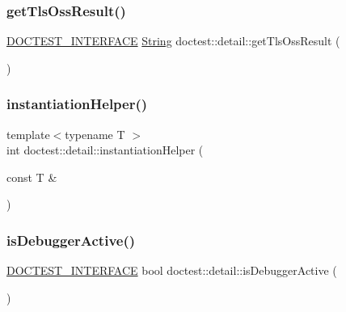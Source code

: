 \mbox{\label{namespacedoctest_1_1detail_a7b0b3df5fe79d7ffa8fa138201476df1}} 
\subsubsection{\texorpdfstring{get\+Tls\+Oss\+Result()}{getTlsOssResult()}}
{\footnotesize\ttfamily \mbox{\hyperlink{doctest_8h_a9c16ffc635ec47f07797d21ede26b1a5}{D\+O\+C\+T\+E\+S\+T\+\_\+\+I\+N\+T\+E\+R\+F\+A\+CE}} \mbox{\hyperlink{classdoctest_1_1_string}{String}} doctest\+::detail\+::get\+Tls\+Oss\+Result (\begin{DoxyParamCaption}{ }\end{DoxyParamCaption})}

\mbox{\label{namespacedoctest_1_1detail_aad401b097a9af4df1d4a9d0911957c0f}} 
\subsubsection{\texorpdfstring{instantiation\+Helper()}{instantiationHelper()}}
{\footnotesize\ttfamily template$<$typename T $>$ \\
int doctest\+::detail\+::instantiation\+Helper (\begin{DoxyParamCaption}\item[{const T \&}]{ }\end{DoxyParamCaption})}

\mbox{\label{namespacedoctest_1_1detail_a013828c4e677241cc26aeea33f762710}} 
\subsubsection{\texorpdfstring{is\+Debugger\+Active()}{isDebuggerActive()}}
{\footnotesize\ttfamily \mbox{\hyperlink{doctest_8h_a9c16ffc635ec47f07797d21ede26b1a5}{D\+O\+C\+T\+E\+S\+T\+\_\+\+I\+N\+T\+E\+R\+F\+A\+CE}} bool doctest\+::detail\+::is\+Debugger\+Active (\begin{DoxyParamCaption}{ }\end{DoxyParamCaption})}

